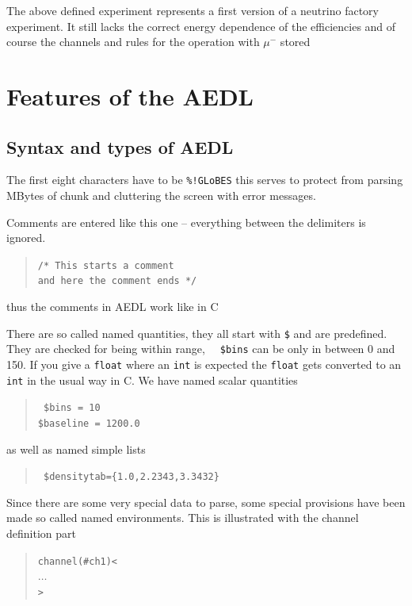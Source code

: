 The above defined experiment represents a first version of a neutrino factory
experiment. It still lacks the correct energy dependence of the efficiencies
and of course the channels and rules for the operation with $\mu^-$ stored

\chapter{Features of the  AEDL}

\section{Syntax and types of  AEDL}
\label{sec:syntax}

 The first eight characters have to be {\tt \%!GLoBES} 
 this serves to protect from parsing MBytes of chunk
 and cluttering the screen with error messages. 

Comments
 are entered like this one -- everything between the 
 delimiters is ignored. 
\begin{quote}
{\tt /* This starts a comment\\
 and here the comment ends */
}
\end{quote}
thus the comments in AEDL work like in C

There are so called  named quantities, they all start with {\tt \$} 
and are predefined. They are checked for being within range, \eg\ {\tt 
\$bins} can be only in between 0 and 150. If you give a {\tt float} where
 an {\tt int} is expected the {\tt float} gets converted to an {\tt int} 
in the usual way in C.  We have named scalar quantities
\begin{quote}
{\tt
\$bins = 10\\
\$baseline = 1200.0
}
\end{quote}
as well as named simple lists
\begin{quote}
{\tt
\$densitytab=\{1.0,2.2343,3.3432\}
}
\end{quote}

Since there are some very special data to parse, some special
provisions have been made so called named environments. This is illustrated 
with the channel definition part
\begin{quote}
{\tt channel(\#ch1)<\\
\tb  $\ldots$\\
>
}
\end{quote}

